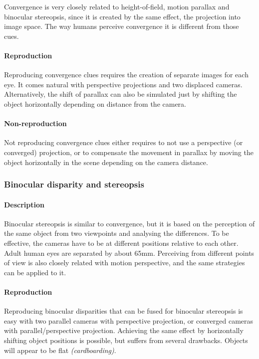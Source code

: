 Convergence is very closely related to height-of-field, motion parallax and binocular stereopsis, since it is created by the same effect, the projection into image space.
The way humans perceive convergence it is different from those cues.

\paragraph{Reproduction}
Reproducing convergence clues requires the creation of separate images for each eye.
It comes natural with perspective projections and two displaced cameras.
Alternatively, the shift of parallax can also be simulated just by shifting the object horizontally depending on distance from the camera.

\paragraph{Non-reproduction}
Not reproducing convergence clues either requires to not use a perspective (or converged) projection, or to compensate the movement in parallax by moving the object horizontally in the scene depending on the camera distance.


\subsubsection{Binocular disparity and stereopsis}
\paragraph{Description}
Binocular stereopsis is similar to convergence, but it is based on the perception of the same object from two viewpoints and analysing the differences.
To be effective, the cameras have to be at different positions relative to each other.
Adult human eyes are separated by about 65mm. Perceiving from different points of view is also closely related with motion perspective, and the same strategies can be applied to it.

\paragraph{Reproduction}
Reproducing binocular disparities that can be fused for binocular stereopsis is easy with two parallel cameras with perspective projection, or converged cameras with parallel/perspective projection.
Achieving the same effect by horizontally shifting object positions is possible, but suffers from several drawbacks.
Objects will appear to be flat \textit{(cardboarding)}.

